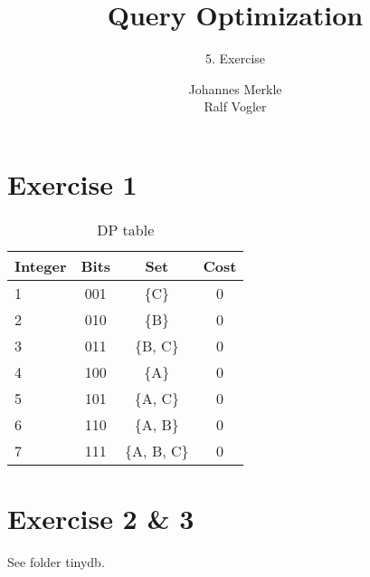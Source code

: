 \documentclass[11pt,a4paper]{scrartcl}
\begin{document}
\author{Johannes Merkle\\Ralf Vogler}
\title{Query Optimization}
\subtitle{5. Exercise}

\maketitle

\section*{Exercise 1}


\begin{table}[H]
  \caption{DP table}
  \begin{center}
 \begin{tabular}{l|c|c|c}
Integer & Bits & Set & Cost\\
\hline
1 & 001 & \{C\} 		& 0\\
2 & 010 & \{B\} 		& 0\\
3 & 011 & \{B, C\} 		& 0\\
4 & 100 & \{A\} 		& 0\\
5 & 101 & \{A, C\} 		& 0\\
6 & 110 & \{A, B\} 		& 0\\
7 & 111 & \{A, B, C\} 	& 0\\
 \end{tabular}  
  \end{center}
 \label{tab:gp1}
\end{table}

\section*{Exercise 2 \& 3}
See folder tinydb.
\end{document}
